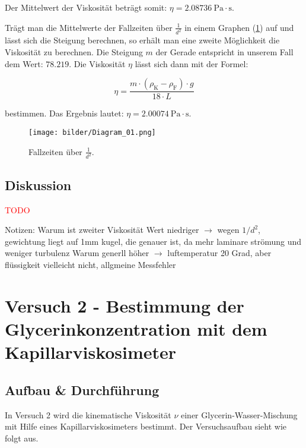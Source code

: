             Der Mittelwert der Viskosität beträgt somit: $\eta = 2.08736\ \mathrm{Pa \cdot s}$.

            Trägt man die Mittelwerte der Fallzeiten über $\frac{1}{d^{2}}$ in einem Graphen (\ref{fig:graph_01}) auf und lässt sich die Steigung berechnen, so erhält man eine zweite Möglichkeit die Viskosität zu berechnen. Die Steigung $m$ der Gerade entspricht in unserem Fall dem Wert: $78.219$. Die Viskosität $\eta$ lässt sich dann mit der Formel: 

            \begin{equation}
                \eta = \frac{m \cdot (\rho_{\mathrm{K}} - \rho_{\mathrm{F}}) \cdot g}{18 \cdot L}
            \end{equation}

            bestimmen. Das Ergebnis lautet: $\eta = 2.00074\ \mathrm{Pa \cdot s}$.

            \begin{figure}
                \centering
                \texttt{[image: bilder/Diagram\_01.png]}
                \caption{Fallzeiten über $\frac{1}{d^{2}}$.}
                \label{fig:graph_01}
            \end{figure}
        
        \subsection{Diskussion}

            \textcolor{red}{TODO}

            Notizen:
            Warum ist zweiter Viskosität Wert niedriger $\rightarrow$ wegen $1/d^2$, gewichtung liegt auf 1mm kugel, die genauer ist, da mehr laminare strömung und weniger turbulenz
            Warum generll höher $\rightarrow$ luftemperatur 20 Grad, aber flüssigkeit vielleicht nicht, allgmeine Messfehler
        
    \section{Versuch 2 - Bestimmung der Glycerinkonzentration mit dem Kapillarviskosimeter}
    \label{sec:Versuch2}

        \subsection{Aufbau \& Durchführung}
            
            In Versuch 2 wird die kinematische Viskosität $\nu$ einer Glycerin-Wasser-Mischung mit Hilfe eines Kapillarviskosimeters bestimmt. Der Versuchsaufbau sieht wie folgt aus.

